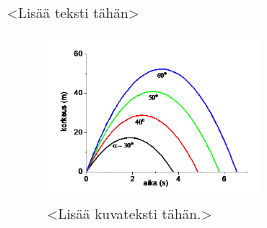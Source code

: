 <Lisää teksti tähän>

\begin{figure}[ht!]
  \centering
  \includegraphics[width=0.5\textwidth]{assets/good-example.png}
  \caption{<Lisää kuvateksti tähän.>}
  \label{fig:good-example}
\end{figure}

\parencite{nawar_multi-heuristic_2014}

\parencite{zhang_test_2007}